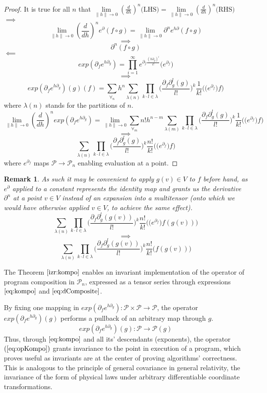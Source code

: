 \documentclass{article}
\newcommand{\dP}{\mathcal{P}}
\newcommand{\D}{\partial}
\newtheorem{opomba}{Remark}[section]
\begin{document}
\begin{proof}
 It is true for all $n$ that $\lim\limits_{\lVert h\rVert\to 0}(\frac{d}{dh})^n\text{(LHS)}=\lim\limits_{\lVert h\rVert\to 0}(\frac{d}{dh})^n\text{(RHS)}$\\
 $\implies$
 $$\lim\limits_{\lVert h\rVert\to 0}(\frac{d}{dh})^ne^\D(f\circ g)=\lim\limits_{\lVert h\rVert\to 0}\D^ne^{h\D}(f\circ g)$$
 $$\implies$$
 $$\D^n(f\circ g)$$
 $\impliedby$
 $$exp(\D_fe^{h\D_g})=\prod_{i=1}^{\infty}e^{\D_f\frac{(h\D_g)^i}{i!}}\Big(e^{\D_f}\Big)$$
 $$\implies$$
 $$exp(\D_fe^{h\D_g})(g)(f)=\sum\limits_{\forall_n}h^n\sum\limits_{\lambda(n)}\prod\limits_{k\cdot l\in\lambda}\Big(\frac{\D_f\D_g^l(g)}{l!}\Big)^k\frac{1}{k!}\Big(\Big(e^{\D_f}\Big)f\Big)$$
 where $\lambda(n)$ stands for the partitions of $n$.
 $$\lim\limits_{\lVert h\rVert\to 0}(\frac{d}{dh})^nexp(\D_fe^{h\D_g})=\lim\limits_{\lVert h\rVert\to 0}\sum\limits_{\forall_m}n!h^{n-m}\sum\limits_{\lambda(m)}\prod\limits_{k\cdot l\in\lambda}\Big(\frac{\D_f\D_g^l(g)}{l!}\Big)^k\frac{1}{k!}\Big(\Big(e^{\D_f}\Big)f\Big)$$
 $$\implies$$
 \begin{equation}\label{eq:dComposite}
 \sum\limits_{\lambda(n)}\prod\limits_{k\cdot l\in\lambda}\Big(\frac{\D_f\D_g^l(g)}{l!}\Big)^k\frac{n!}{k!}\Big(\Big(e^{\D_f}\Big)f\Big)
 \end{equation}
 where $e^{\D_f}$ maps $\dP\to\dP_n$ enabling evaluation at a point. 
 \end{proof}       
 \begin{opomba}
 As such it may be convenient to apply $g(v)\in V$ to $f$ before hand, as $e^\D$ applied to a constant represents the identity map and grants us the derivative $\D^n$ at a point $v\in V$ instead of an expansion into a multitensor (onto which we would have otherwise applied $v\in V$, to achieve the same effect).
  $$\sum\limits_{\lambda(n)}\prod\limits_{k\cdot l\in\lambda}\Big(\frac{\D_f\D_g^l(g(v))}{l!}\Big)^k\frac{n!}{k!}\Big(\Big(e^{\D_f}\Big)f(g(v))\Big)$$
  $$\implies$$
  \begin{equation}\label{eq:dCompositePoint}
  \sum\limits_{\lambda(n)}\prod\limits_{k\cdot l\in\lambda}\Big(\frac{\D_f\D_g^l(g(v))}{l!}\Big)^k\frac{n!}{k!}\Big(f(g(v))\Big)
  \end{equation}
 \end{opomba}
 The Theorem $\ref{izr:kompo}$ enables an invariant implementation of the operator of program composition in $\dP_n$, expressed as a tensor series through expressions $\eqref{eq:kompo}$ and $\eqref{eq:dComposite}$. 
 
 By fixing one mapping in $exp(\D_fe^{h\D_g}): \dP\times\dP\to\dP$, the operator $exp(\D_fe^{h\D_g})(g)$ performs a pullback of an arbitrary map through $g$. 
  \begin{equation}\label{eq:opKompo}
  exp(\D_fe^{h\D_g})(g): \dP\to\dP(g)
  \end{equation}
 Thus, through $\eqref{eq:kompo}$ and all its' descendants (exponents), the operator $(\ref{eq:opKompo})$ grants invariance to the point in execution of a program, which proves useful as invariants are at the center of proving algorithms' correctness. This is analogous to the principle of general covariance in general relativity, the invariance of the form of physical laws under arbitrary differentiable coordinate transformations.
 
\end{document}
